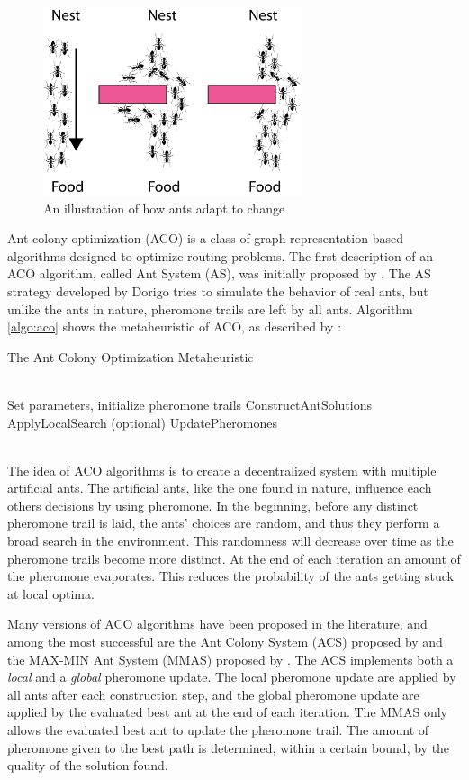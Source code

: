 \begin{figure}[H]
  \centering
  \includegraphics[width=3in]{assets/maur.png}
  \caption{An illustration of how ants adapt to change} 
   \label{fig:ants}
\end{figure}

Ant colony optimization (ACO) is a class of graph representation based algorithms designed to optimize routing problems. The first description of an ACO algorithm, called Ant System (AS), was initially proposed by \citet{dorigo96}. The AS strategy developed by Dorigo tries to simulate the behavior of real ants, but unlike the ants in nature, pheromone trails are left by all ants. Algorithm \ref{algo:aco} shows the metaheuristic of ACO, as described by \citet{dorigo06}:
\begin{algorithm}[H]
\caption{The Ant Colony Optimization Metaheuristic}
\label{algo:aco}
\begin{algorithmic}
\\ Set parameters, initialize pheromone trails
    \State ConstructAntSolutions
    \State ApplyLocalSearch (optional)
    \State UpdatePheromones
  \EndWhile
\end{algorithmic}
\end{algorithm}
~\\

The idea of ACO algorithms is to create a decentralized system with multiple artificial ants. The artificial ants, like the one found in nature, influence each others decisions by using pheromone. In the beginning, before any distinct pheromone trail is laid, the ants' choices are random, and thus they perform a broad search in the environment. This randomness will decrease over time as the pheromone trails become more distinct. At the end of each iteration an amount of the pheromone evaporates. This reduces the probability of the ants getting stuck at local optima. 

Many versions of ACO algorithms have been proposed in the literature, and among the most successful are the Ant Colony System (ACS) proposed by \citet{dorigo97} and the MAX-MIN Ant System (MMAS) proposed by \citet{stutzle06}. The ACS implements both a \textit{local} and a \textit{global} pheromone update. The local pheromone update are applied by all ants after each construction step, and the global pheromone update are applied by the evaluated best ant at the end of each iteration. The MMAS only allows the evaluated best ant to update the pheromone trail. The amount of pheromone given to the best path is determined, within a certain bound, by the quality of the solution found. 

